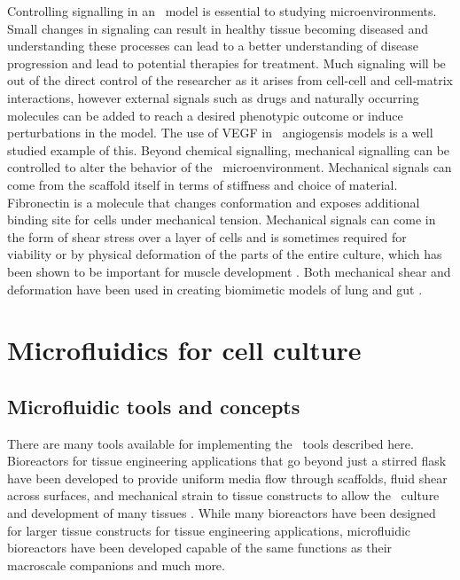 Controlling signalling in an \invitro\ model is essential to studying microenvironments. Small changes in signaling can result in healthy tissue becoming diseased \cite{Ziyad2011} and understanding these processes can lead to a better understanding of disease progression and lead to potential therapies for treatment. Much signaling will be out of the direct control of the researcher as it arises from cell-cell and cell-matrix interactions, however external signals such as drugs and naturally occurring molecules can be added to reach a desired phenotypic outcome or induce perturbations in the model. The use of VEGF in \invitro\ angiogensis models is a well studied example of this. Beyond chemical signalling, mechanical signalling can be controlled to alter the behavior of the \invitro\ microenvironment. Mechanical signals can come from the scaffold itself in terms of stiffness and choice of material. Fibronectin is a molecule that changes conformation and exposes additional binding site for cells under mechanical tension. Mechanical signals can come in the form of shear stress over a layer of cells and is sometimes required for viability \cite{White2007, Dimmeler1996, Traub1998} or by physical deformation of the parts of the entire culture, which has been shown to be important for muscle development \cite{Leung1976, Humphrey2014, Back2013}. Both mechanical shear and deformation have been used in creating biomimetic models of lung and gut \cite{Kim2013a,  Huh2010a}. 

\section{Microfluidics for cell culture}

\subsection{Microfluidic tools and concepts}
There are many tools available for implementing the \invitro\ tools described here. Bioreactors for tissue engineering applications that go beyond just a stirred flask have been developed to provide uniform media flow through scaffolds, fluid shear across surfaces, and mechanical strain to tissue constructs to allow the \invitro\ culture and development of many tissues \cite{Martin2004}. While many bioreactors have been designed for larger tissue constructs for tissue engineering applications, microfluidic bioreactors have been developed capable of the same functions as their macroscale companions and much more\cite{Andersson2004, Khademhosseini2006, Choi2007a}. 

